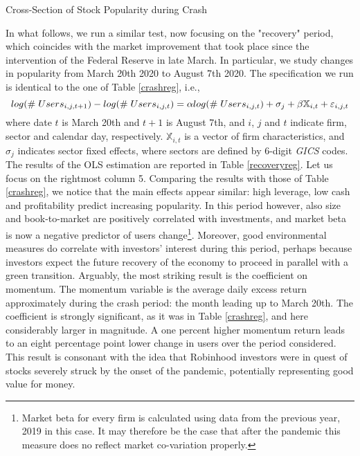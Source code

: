 \documentclass[12pt]{article}
\numberwithin{equation}{section} %
\begin{document}
\begin{table}[H]
\caption{Cross-Section of Stock Popularity during Crash}
 \label{crashreg}
\end{table}

In what follows, we run a similar test, now focusing on the "recovery" period, which coincides with the market improvement that took place since the intervention of the Federal Reserve in late March. In particular, we study changes in popularity from March 20th 2020 to August 7th 2020.
The specification we run is identical to the one of Table \ref{crashreg}, i.e.,
$$
log(\# \hspace{1mm} Users_{i,j,t+1})-log(\# \hspace{1mm} Users_{i,j,t}) = \alpha log(\# \hspace{1mm} Users_{i,j,t}) + \sigma_j + \beta \mathbb{X}_{i,t} + \varepsilon_{i,j,t}
$$
where date $t$ is March 20th and $t+1$ is August 7th, and $i$, $j$ and $t$ indicate firm, sector and calendar day, respectively. $\mathbb{X}_{i,t}$ is a vector of firm characteristics, and  $\sigma_j$ indicates sector fixed effects, where sectors are defined by 6-digit \textit{GICS} codes.  The results of the OLS estimation are reported in Table \ref{recoveryreg}. Let us focus on the rightmost column 5. Comparing the results with those of Table \ref{crashreg}, we notice that the main effects appear similar: high leverage, low cash and profitability predict increasing popularity. In this period however, also size and book-to-market are positively correlated with investments, and market beta is now a negative predictor of users change\footnote{Market beta for every firm is calculated using data from the previous year, 2019 in this case. It may therefore be the case that after the pandemic this measure does no reflect market co-variation properly.}. Moreover, good environmental measures do correlate with investors' interest during this period, perhaps because investors expect the future recovery of the economy to proceed in parallel with a green transition. Arguably, the most striking result is the coefficient on momentum. The momentum variable is the average daily excess return approximately during the crash period: the month leading up to March 20th. The coefficient is strongly significant, as it was in Table \ref{crashreg}, and here considerably larger in magnitude. A one percent higher momentum return leads to an eight percentage point lower change in users over the period considered. This result is consonant with the idea that Robinhood investors were in quest of stocks severely struck by the onset of the pandemic, potentially representing good value for money.
\end{document}
